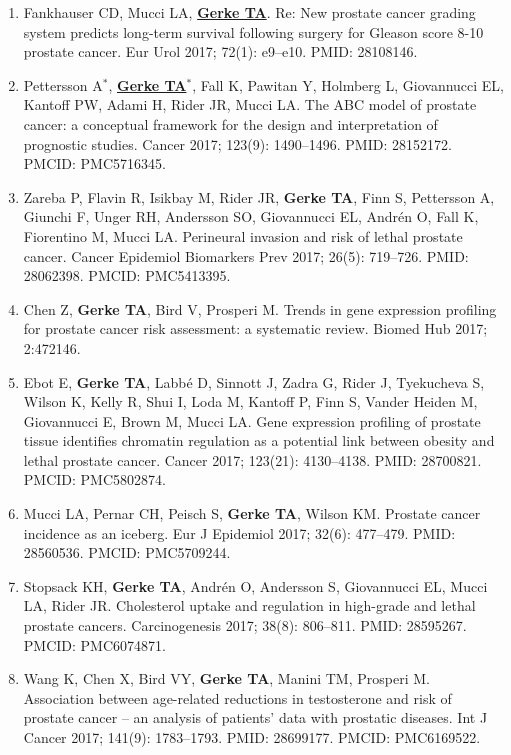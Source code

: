 \documentclass[11pt, a4paper]{article} %
\begin{document}
\begin{enumerate}[leftmargin=*]
\item{} Fankhauser CD, Mucci LA, \underline{{\bf Gerke TA}}. Re: New prostate cancer grading system predicts long-term survival following surgery for Gleason score 8-10 prostate cancer. Eur Urol 2017; 72(1): e9--e10. PMID: 28108146.

\item{} Pettersson A$^*$, \underline{{\bf Gerke TA$^*$}}, Fall K, Pawitan Y, Holmberg L, Giovannucci EL, Kantoff PW, Adami H, Rider JR, Mucci LA. The ABC model of prostate cancer: a conceptual framework for the design and interpretation of prognostic studies. Cancer 2017; 123(9): 1490--1496. PMID: 28152172. PMCID: PMC5716345. 

\item{}  Zareba P, Flavin R, Isikbay M, Rider JR, {\bf Gerke TA}, Finn S, Pettersson A, Giunchi F, Unger RH, Andersson SO, Giovannucci EL, Andr\'{e}n O, Fall K, Fiorentino M, Mucci LA. Perineural invasion and risk of lethal prostate cancer. Cancer Epidemiol Biomarkers Prev 2017; 26(5): 719--726. PMID: 28062398. PMCID: PMC5413395.

\item{} Chen Z, {\bf Gerke TA}, Bird V, Prosperi M. Trends in gene expression profiling for prostate cancer risk assessment: a systematic review. Biomed Hub 2017; 2:472146.

\item{} Ebot E, {\bf Gerke TA},  Labb\'{e} D, Sinnott J, Zadra G, Rider J, Tyekucheva S, Wilson K, Kelly R, Shui I, Loda M, Kantoff P, Finn S, Vander Heiden M, Giovannucci E, Brown M, Mucci LA. Gene expression profiling of prostate tissue identifies chromatin regulation as a potential link between obesity and lethal prostate cancer. Cancer 2017; 123(21): 4130--4138. PMID: 28700821. PMCID: PMC5802874.

\item{} Mucci LA, Pernar CH, Peisch S, {\bf Gerke TA}, Wilson KM. Prostate cancer incidence as an iceberg. Eur J Epidemiol 2017; 32(6): 477--479. PMID: 28560536. PMCID: PMC5709244. 

\item{} Stopsack KH, {\bf Gerke TA}, Andr\'{e}n O, Andersson S, Giovannucci EL, Mucci LA, Rider JR. Cholesterol uptake and regulation in high-grade and lethal prostate cancers. Carcinogenesis 2017; 38(8): 806--811. PMID: 28595267. PMCID: PMC6074871.

\item{} Wang K, Chen X, Bird VY, {\bf Gerke TA}, Manini TM, Prosperi M. Association between age-related reductions in testosterone and risk of prostate cancer -- an analysis of patients' data with prostatic diseases. Int J Cancer 2017; 141(9): 1783--1793. PMID: 28699177. PMCID: PMC6169522.


\end{enumerate}
\end{document}
